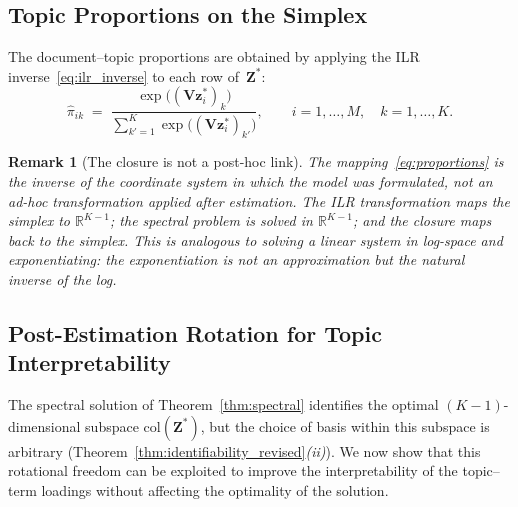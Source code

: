 \documentclass{article}
\newtheorem{remark}{Remark}
\begin{document}
\subsection{Topic Proportions on the Simplex}
\label{subsec:proportions}

The document--topic proportions are obtained by applying the ILR
inverse~\eqref{eq:ilr_inverse} to each row of~$\mathbf{Z}^*$:
\begin{equation}
  \hat{\pi}_{ik}
  \;=\;
  \frac{\exp\!\bigl((\mathbf{V}\mathbf{z}_i^*)_k\bigr)}
       {\displaystyle\sum_{k'=1}^{K}
        \exp\!\bigl((\mathbf{V}\mathbf{z}_i^*)_{k'}\bigr)},
  \qquad i=1,\dots,M,\quad k=1,\dots,K.
  \label{eq:proportions}
\end{equation}

\begin{remark}[The closure is not a post-hoc link]
\label{rem:closure_not_posthoc}
The
mapping~\eqref{eq:proportions} is the \emph{inverse of the coordinate
system} in which the model was formulated, not an ad-hoc transformation
applied after estimation. The ILR transformation maps the simplex to
$\mathbb{R}^{K-1}$; the spectral problem is solved in
$\mathbb{R}^{K-1}$; and the closure maps back to the simplex.
This is analogous to solving a linear system in log-space and
exponentiating: the exponentiation is not an approximation but the
natural inverse of the log.
\end{remark}

\subsection{Post-Estimation Rotation for Topic Interpretability}
\label{subsec:rotation}
 
The spectral solution of Theorem~\ref{thm:spectral} identifies the
optimal $(K{-}1)$-dimensional subspace
$\mathrm{col}(\mathbf{Z}^*)$, but the choice of basis within this
subspace is arbitrary
(Theorem~\ref{thm:identifiability_revised}\emph{(ii)}). We now show
that this rotational freedom can be exploited to improve the
interpretability of the topic--term loadings without affecting the
optimality of the solution.
 
\end{document}
